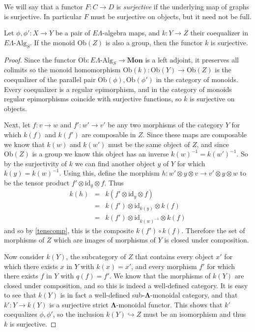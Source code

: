 \documentclass{amsbook} %
\newcommand{\mb}{\mathbf}
\newcommand{\id}{\textrm{id}}
\newcommand{\ML}{\mathbf{\Lambda}}
\newcommand{\mon}{\ensuremath{\mb{Mon}}}
\numberwithin{section}{chapter}
\begin{document}
\begin{Defi}
We will say that a functor $F \colon  C \to D$ is \emph{surjective} if the underlying map of graphs is surjective. In particular $F$ must be surjective on objects, but it need not be full.
\end{Defi}

\begin{prop}\label{coeqsurj} Let $\phi, \phi' \colon X \to Y$ be a pair of $E\Lambda$-algebra maps, and $k \colon  Y \to Z$ their coequalizer in $E\Lambda\mbox{-}\mathrm{Alg}_S$. If the monoid $\mathrm{Ob}(Z)$ is also a group, then the functor $k$ is surjective.
\end{prop}
\begin{proof}
Since the functor $\mathrm{Ob} \colon E\Lambda\mbox{-}\mathrm{Alg}_S \to \mon$ is a left adjoint, it preserves all colimits so the monoid homomorphism $\mathrm{Ob}(k) \colon  \mathrm{Ob}(Y) \to \mathrm{Ob}(Z)$ is the coequalizer of the parallel pair $\mathrm{Ob}(\phi), \mathrm{Ob}(\phi')$ in the category of monoids. Every coequalizer is a regular epimorphism, and in the category of monoids regular epimorphisms coincide with  surjective functions, so $k$ is surjective on objects.


Next, let $f \colon  v \to w$ and $f' \colon w' \to v'$ be any two morphisms of the category $Y$ for which $k(f)$ and $k(f')$ are composable in $Z$. Since these maps are composable we know that $k(w)$ and $k(w')$ must be the same object of $Z$, and since $\mathrm{Ob}(Z)$ is a group we know this object has an inverse $k(w)^{-1} = k(w')^{-1}$. So by the surjectivity of $k$ we can find another object $y$ of $Y$ for which $k(y) = k(w)^{-1}$. Using this, define the morphism $h \colon  w' \otimes y \otimes v \to v' \otimes y \otimes w$ to be the tensor product $f' \otimes \id_y \otimes f$. Thus
\[ \begin{array}{rll}
		k(h) & = & k(f' \otimes \id_y \otimes f) \\
		& = & k(f') \otimes \id_{k(y)} \otimes k(f) \\
		& = & k(f') \otimes \id_{k(w)^{-1}} \otimes k(f)
		\end{array}
\]
and so by \cref{tenscomp}, this is the composite $k(f') \circ k(f)$. Therefore the set of morphisms of $Z$ which are images of morphisms of $Y$ is closed under composition. 

Now consider $k(Y)$, the subcategory of $Z$ that contains every object $x'$ for which there exists $x$ in $Y$ with $k(x) = x'$, and every morphism $f'$ for which there exists $f$ in $Y$ with $q(f) = f'$. We know that the morphisms of $k(Y)$ are closed under composition, and so this is indeed a well-defined category. It is easy to see that $k(Y)$ is in fact a well-defined sub-$\ML$-monoidal category, and that $k' \colon  Y \to k(Y)$ is a surjective strict $\ML$-monoidal functor. This shows that $k'$ coequalizes $\phi, \phi'$, so the inclusion $k(Y) \hookrightarrow Z$ must be an isomorphism and thus $k$ is surjective.
\end{proof}
\end{document}
